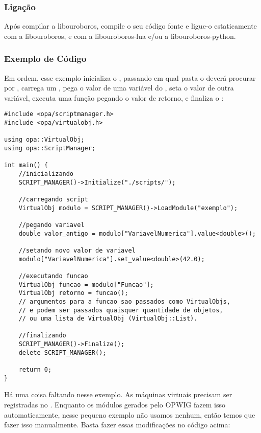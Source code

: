 \subsubsection{Ligação} 
Após compilar a libouroboros, compile o seu código fonte e ligue-o estaticamente
com a libouroboros, e com a libouroboros-lua e/ou a libouroboros-python.
    
\subsubsection{Exemplo de Código} 
Em ordem, esse exemplo inicializa o \SMgr{}, passando em qual pasta
o \SMgr{} deverá procurar por , carrega um \script{},
pega o valor de uma variável do \script{}, seta o valor de outra variável, 
executa uma função pegando o valor de retorno, e finaliza o \SMgr{}:
    
\begin{lstlisting}
#include <opa/scriptmanager.h>
#include <opa/virtualobj.h>

using opa::VirtualObj;
using opa::ScriptManager;

int main() {
    //inicializando
    SCRIPT_MANAGER()->Initialize("./scripts/");
    
    //carregando script
    VirtualObj modulo = SCRIPT_MANAGER()->LoadModule("exemplo");
    
    //pegando variavel
    double valor_antigo = modulo["VariavelNumerica"].value<double>();
    
    //setando novo valor de variavel
    modulo["VariavelNumerica"].set_value<double>(42.0);
    
    //executando funcao
    VirtualObj funcao = modulo["Funcao"];
    VirtualObj retorno = funcao(); 
    // argumentos para a funcao sao passados como VirtualObjs, 
    // e podem ser passados quaisquer quantidade de objetos,
    // ou uma lista de VirtualObj (VirtualObj::List).
    
    //finalizando
    SCRIPT_MANAGER()->Finalize();
    delete SCRIPT_MANAGER();
    
    return 0;
}
\end{lstlisting}

Há uma coisa faltando nesse exemplo. As máquinas virtuais precisam ser registradas no \SMgr{}.
Enquanto os módulos gerados pelo OPWIG fazem isso automaticamente, nesse pequeno exemplo não
usamos nenhum, então temos que fazer isso manualmente. Basta fazer essas modificações no código acima:

